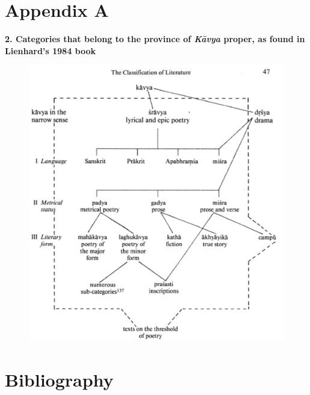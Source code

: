 \section*{Appendix A}

\textbf{2. Categories that belong to the province of \textit{Kāvya} proper, as found in Lienhard’s 1984 book}
\begin{figure}[H]
\centering
\includegraphics[scale=.52]{images/chapter8/image1.png}
\end{figure}

\section*{Bibliography}


